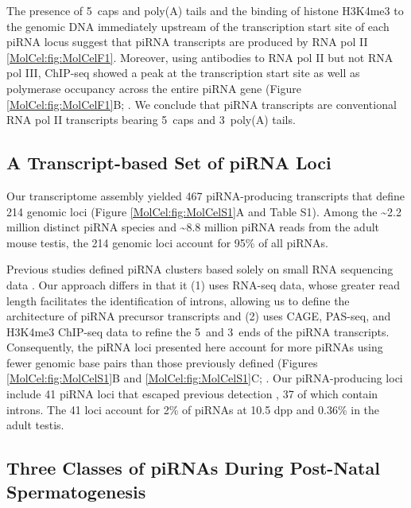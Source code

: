     The presence of 5\textprime~caps and poly(A) tails and the binding of histone H3K4me3 to the genomic DNA immediately upstream of the transcription start site of each piRNA locus suggest that piRNA transcripts are produced by RNA pol II \ref{MolCel:fig:MolCelF1}. Moreover, using antibodies to RNA pol II but not RNA pol III, ChIP-seq showed a peak at the transcription start site as well as polymerase occupancy across the entire piRNA gene (Figure \ref{MolCel:fig:MolCelF1}B; \citep{Kutter2011}. We conclude that piRNA transcripts are conventional RNA pol II transcripts bearing 5\textprime~caps and 3\textprime~poly(A) tails.

  \subsection{A Transcript-based Set of piRNA Loci}
    \label{MolCel:subsec:A TX-based set of piRNA loci}

    Our transcriptome assembly yielded 467 piRNA-producing transcripts that define 214 genomic loci (Figure \ref{MolCel:fig:MolCelS1}A and Table S1). Among the \textasciitilde2.2 million distinct piRNA species and \textasciitilde8.8 million piRNA reads from the adult mouse testis, the 214 genomic loci account for 95\% of all piRNAs.

    Previous studies defined piRNA clusters based solely on small RNA sequencing data \citep{Girard2006, Lau2006, Aravin2007a}. Our approach differs in that it (1) uses RNA-seq data, whose greater read length facilitates the identification of introns, allowing us to define the architecture of piRNA precursor transcripts and (2) uses CAGE, PAS-seq, and H3K4me3 ChIP-seq data to refine the 5\textprime~and 3\textprime~ends of the piRNA transcripts. Consequently, the piRNA loci presented here account for more piRNAs using fewer genomic base pairs than those previously defined (Figures \ref{MolCel:fig:MolCelS1}B and \ref{MolCel:fig:MolCelS1}C; \citep{Lau2006, Girard2006}. Our piRNA-producing loci include 41 piRNA loci that escaped previous detection \citep{Girard2006, Lau2006, Aravin2007a}, 37 of which contain introns. The 41 loci account for 2\% of piRNAs at 10.5 dpp and 0.36\% in the adult testis.

  \subsection{Three Classes of piRNAs During Post-Natal Spermatogenesis}
    \label{MolCel:subsec:Three Classes of piRNAs in testes}

